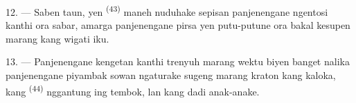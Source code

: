 12. --- Saben taun, yen  \textsuperscript{(43)} maneh
nuduhake  sepisan  panjenengane
ngentosi  kanthi ora sabar, amarga panjenengane
pirsa yen putu-putune ora bakal kesupen marang  kang
wigati iku.

13. --- Panjenengane kengetan kanthi trenyuh marang wektu biyen banget
nalika panjenengane piyambak sowan ngaturake sugeng marang
 kraton kang kaloka, kang 
\textsuperscript{(44)} nggantung ing tembok, lan kang dadi
 anak-anake.

\VUsaut{6.0mm}
\VUfilet{22mm}
